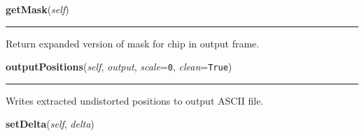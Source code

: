     \label{multireg:chipwavelets:Chip:getMask}
    \vspace{0.5ex}

    \begin{boxedminipage}{\textwidth}

    \raggedright \textbf{getMask}(\textit{self})

    \vspace{-1.5ex}

    \rule{\textwidth}{0.5\fboxrule}
    Return expanded version of mask for chip in output frame.

    \vspace{1ex}

    \end{boxedminipage}

    \label{multireg:chipwavelets:Chip:outputPositions}
    \vspace{0.5ex}

    \begin{boxedminipage}{\textwidth}

    \raggedright \textbf{outputPositions}(\textit{self}, \textit{output}, \textit{scale}=\texttt{0\-}, \textit{clean}=\texttt{T\-r\-u\-e\-})

    \vspace{-1.5ex}

    \rule{\textwidth}{0.5\fboxrule}
    Writes extracted undistorted positions to output ASCII file.

    \vspace{1ex}

    \end{boxedminipage}

    \label{multireg:chipwavelets:Chip:setDelta}
    \vspace{0.5ex}

    \begin{boxedminipage}{\textwidth}

    \raggedright \textbf{setDelta}(\textit{self}, \textit{delta})

    \end{boxedminipage}


